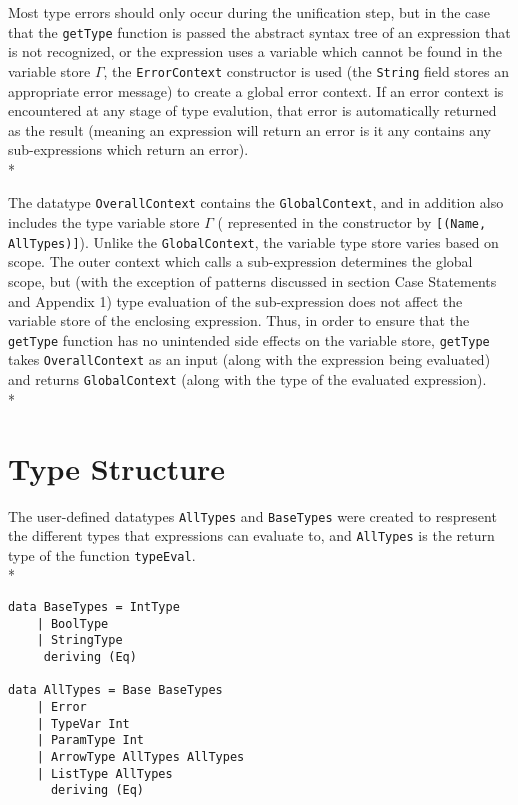 \documentclass[11pt]{article}
\begin{document}
Most type errors should only occur during the unification step, but in the case that the \verb|getType| function is passed the abstract syntax tree of an expression that is not recognized, or the expression uses a variable which cannot be found in the variable store $\Gamma$, the \verb|ErrorContext| constructor is used (the \verb|String| field stores an appropriate error message) to create a global error context. If an error context is encountered at any stage of type evalution, that error is automatically returned as the result (meaning an expression will return an error is it any contains any sub-expressions which return an error).\\*   

The datatype \verb|OverallContext| contains the \verb|GlobalContext|, and in addition also includes the type variable store $\Gamma$ ( represented in the constructor by \verb|[(Name, AllTypes)]|). Unlike the \verb|GlobalContext|, the variable type store varies based on scope. The outer context which calls a sub-expression determines the global scope, but (with the exception of patterns discussed in section Case Statements and Appendix 1) type evaluation of the sub-expression does not affect the variable store of the enclosing expression. Thus, in order to ensure that the \verb|getType| function has no unintended side effects on the variable store, \verb|getType| takes \verb|OverallContext| as an input (along with the expression being evaluated) and returns \verb|GlobalContext| (along with the type of the evaluated expression). \\*
     
\section*{Type Structure}

The user-defined datatypes \verb|AllTypes| and \verb|BaseTypes| were created to respresent the different types that expressions can evaluate to, and \verb|AllTypes| is the return type of the function \verb|typeEval|.\\*

\begin{verbatim} 
data BaseTypes = IntType
    | BoolType
    | StringType
     deriving (Eq)
      
data AllTypes = Base BaseTypes
    | Error
    | TypeVar Int
    | ParamType Int
    | ArrowType AllTypes AllTypes
    | ListType AllTypes
      deriving (Eq)
\end{verbatim} 
\end{document}
